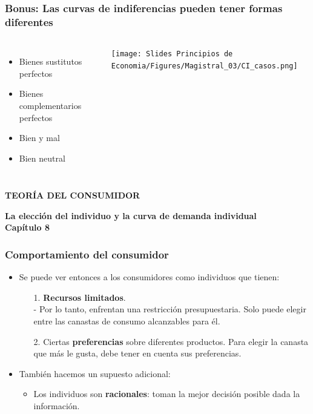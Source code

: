 \documentclass{beamer}
\begin{document}
\begin{frame}
\frametitle{Bonus: Las curvas de indiferencias pueden tener formas diferentes}
\begin{columns}
    \begin{itemize}
        \item Bienes sustitutos perfectos
        \item Bienes complementarios perfectos
        \item Bien y mal
        \item Bien neutral
    \end{itemize}

    \texttt{[image: Slides Principios de Economia/Figures/Magistral\_03/CI\_casos.png]}
\end{columns}
\end{frame}

\begin{frame}
    \centering
    \begin{boxB}
    \centering \Large \textbf{TEORÍA DEL CONSUMIDOR} \\   
    \end{boxB}
     \vspace{2mm}
    \Large \textbf{La elección del individuo y la curva de demanda individual} \\
     \vspace{5mm}
    \large \textbf{Capítulo 8}
\end{frame}

\begin{frame}
\frametitle{Comportamiento del consumidor}
\begin{itemize}
    \item Se puede ver entonces a los consumidores como individuos que tienen: \vspace{-2mm}
    \begin{itemize}
        \item[1.] \textbf{Recursos limitados}. \\
        - Por lo tanto, enfrentan una restricción presupuestaria. Solo puede elegir entre las canastas de consumo alcanzables
        para él. \vspace{2mm}
        \item[2.] Ciertas \textbf{preferencias} sobre diferentes productos. Para elegir la canasta que más le gusta, debe tener en cuenta
        sus preferencias. \\ \vspace{2mm}
    \end{itemize}
    
    \item También hacemos un supuesto adicional: \vspace{2mm}
    \begin{itemize}
    \item Los individuos son \textbf{racionales}: toman la mejor decisión posible dada la información.
    \end{itemize}
\end{itemize} 
\end{frame}
\end{document}
